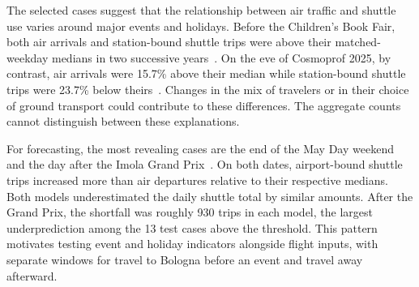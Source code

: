 \documentclass[preprint,12pt,times]{elsarticle}
\begin{document}
\begin{table}[!htbp]
\centering\small
\caption{Selected high-demand days. Percentages are relative to the matched-weekday median. SCHED and PAX show forecast minus observed shuttle trips for dates in the test period.}
\label{tab:event_context}
\setlength{\tabcolsep}{3pt}
\end{table}

The selected cases suggest that the relationship between air traffic and shuttle use varies around major events and holidays. Before the Children's Book Fair, both air arrivals and station-bound shuttle trips were above their matched-weekday medians in two successive years~\cite{eventfairs2024,eventfairs2025}. On the eve of Cosmoprof 2025, by contrast, air arrivals were 15.7\% above their median while station-bound shuttle trips were 23.7\% below theirs~\cite{eventfairs2025}. Changes in the mix of travelers or in their choice of ground transport could contribute to these differences. The aggregate counts cannot distinguish between these explanations.

For forecasting, the most revealing cases are the end of the May Day weekend and the day after the Imola Grand Prix~\cite{eventmayday,eventimola}. On both dates, airport-bound shuttle trips increased more than air departures relative to their respective medians. Both models underestimated the daily shuttle total by similar amounts. After the Grand Prix, the shortfall was roughly 930 trips in each model, the largest underprediction among the 13 test cases above the threshold. This pattern motivates testing event and holiday indicators alongside flight inputs, with separate windows for travel to Bologna before an event and travel away afterward.
\end{document}
